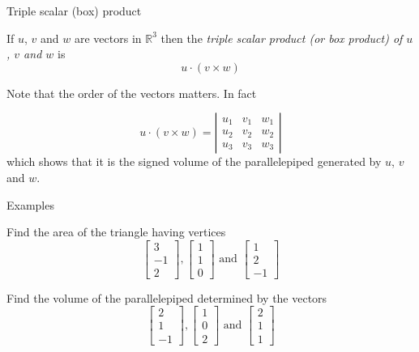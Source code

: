 \documentclass{beamer}
\begin{document}
\begin{frame}{Triple scalar (box) product}
\begin{definition}
If $u$, $v$ and $w$ are vectors in $\mathbb{R}^3$ then the \emph{triple scalar product (or box product) of $u$, $v$ and $w$} is
\begin{equation*}
u\cdot (v\times w)
\end{equation*}
\end{definition}
Note that the order of the vectors matters. In fact
\begin{lemma}
\begin{equation*}
u\cdot (v\times w) = \left|
\begin{array}{ccc}
u_1 &v_1 &w_1\\
u_2 &v_2 &w_2\\
u_3&v_3&w_3
\end{array}
\right|
\end{equation*}
which shows that it is the signed volume of the parallelepiped generated by $u$, $v$ and $w$.
\end{lemma}
\end{frame}

\begin{frame}{Examples}
\begin{example}
Find the area of the triangle having vertices
\begin{equation*}
\left[
\begin{array}{c}
3\\
-1\\
2
\end{array}
\right], \left[
\begin{array}{c}
1\\
1\\
0
\end{array}
\right]\text{ and } \left[
\begin{array}{c}
1\\
2\\
-1
\end{array}
\right]
\end{equation*}
\end{example}
\begin{example}
Find the volume of the parallelepiped determined by the vectors
\begin{equation*}
\left[
\begin{array}{c}
2\\
1\\
-1
\end{array}
\right], \left[
\begin{array}{c}
1\\
0\\
2
\end{array}
\right]\text{ and } \left[
\begin{array}{c}
2\\
1\\
1
\end{array}
\right]
\end{equation*}
\end{example}
\end{frame}
\end{document}
